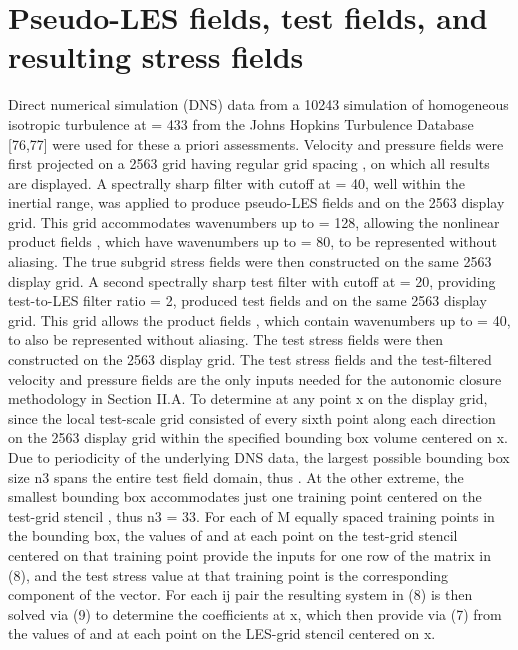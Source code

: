 \section{Pseudo-LES fields, test fields, and resulting stress fields} 

Direct numerical simulation (DNS) data from a 10243 simulation of homogeneous isotropic turbulence at  = 433 from the Johns Hopkins Turbulence Database [76,77] were used for these a priori assessments. Velocity   and pressure   fields were first projected on a 2563 grid having regular grid spacing  , on which all results are displayed. A spectrally sharp filter with cutoff at   = 40, well within the inertial range, was applied to produce pseudo-LES fields   and   on the 2563 display grid. This grid accommodates wavenumbers up to  = 128, allowing the nonlinear product fields  , which have wavenumbers up to 
 = 80, to be represented without aliasing. The true subgrid stress fields   were then constructed on the same 2563 display grid. A second spectrally sharp test filter with cutoff at   = 20, providing test-to-LES filter ratio  = 2, produced test fields   and   on the same 2563 display grid. This grid allows the product fields  , which contain wavenumbers up to  = 40, to also be represented without aliasing. The test stress fields   were then constructed on the 2563 display grid. 
The test stress fields   and the test-filtered velocity   and pressure   fields are the only inputs needed for the autonomic closure methodology in Section II.A. To determine   at any point x on the display grid, since   the local test-scale grid consisted of every sixth point along each direction on the 2563 display grid within the specified bounding box volume centered on x. Due to periodicity of the underlying DNS data, the largest possible bounding box size n3 spans the entire test field domain, thus  . At the other extreme, the smallest bounding box accommodates just one training point centered on the   test-grid stencil  , thus n3 = 33. For each of M equally spaced training points in the bounding box, the values of   and   at each point on the test-grid stencil   centered on that training point provide the inputs for one row of the matrix   in (8), and the test stress value   at that training point is the corresponding component of the   vector. For each ij pair the resulting   system in (8) is then solved via (9) to determine the coefficients   at x, which then provide   via (7) from the values of   and   at each point on the LES-grid stencil   centered on x.  


